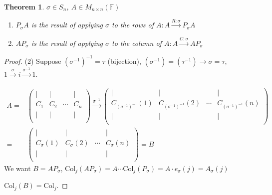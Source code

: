 \documentclass[12pt]{article}
\theoremstyle{plain}
\newtheorem{theorem}{Theorem}[subsection]
\newcommand{\Col}{\mathrm{Col}}
\newcommand{\mF}{{\mathbb{F}}}
\begin{document}
\begin{theorem}
	$\sigma \in S_n$, $A \in M_{n\times n} (\mF)$
	\begin{enumerate}
		\item $P_{\sigma} A$ is the result of applying $\sigma$ to the rows of 
			$A : A \overset{R: \sigma}{\longrightarrow} P_{\sigma}A$
		\item $A P_{\sigma}$ is the result of applying $\sigma$ to the column
			of $A:A \overset{C: \sigma}{\longrightarrow} AP_{\sigma}$
	\end{enumerate}
\end{theorem}
\begin{proof}
	(2) Suppose $(\sigma^{-1})^{-1} = \tau$ (bijection), 
	$(\sigma^{-1}) = (\tau^{-1}) \rightarrow \sigma = \tau$, 
	$1 \overset{\sigma}{\longrightarrow}i 
	\overset{\sigma^{-1}}{\longrightarrow} 1$. 

	\begin{align*}
		A = &
		\begin{pmatrix}
			| & | &  & |	\\
			C_1 & C_2 & \cdots & C_n	\\
			| & | &  & |	\\
		\end{pmatrix}
		\overset{\sigma^{-1}}{\longrightarrow}
		\begin{pmatrix}
			| & | &  & |	\\
			C_{(\sigma^{-1})^{-1}}(1) & C_{(\sigma^{-1})^{-1}}(2) &
			\cdots & C_{(\sigma^{-1})^{-1}}(n)	\\
			| & | &  & |	\\
		\end{pmatrix}\\
		=&
		\begin{pmatrix}
			| & | &  & |	\\
			C_{\sigma}(1) & C_{\sigma}(2) &
			\cdots &C_{\sigma}(n)	\\
			| & | &  & |	\\
		\end{pmatrix}
		= B
	\end{align*}
	We want $B = A P_{\sigma}$, 
	$\Col_j(AP_{\sigma}) = A\cdots \Col_j(P_{\sigma}) = A \cdot e_{\sigma}(j)
	= A_{\sigma}(j)$ 

	$\Col_j(B) = \Col_j$. 
\end{proof}
\end{document}
